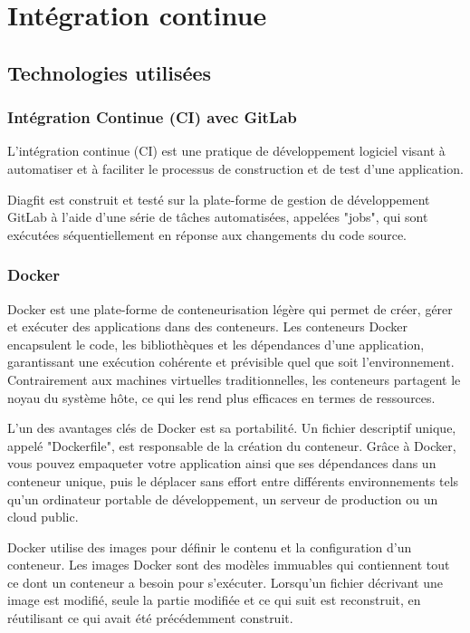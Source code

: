 \section{Intégration continue}
\subsection{Technologies utilisées}
\subsubsection{Intégration Continue (CI) avec GitLab}
L'intégration continue (CI) est une pratique de développement logiciel visant à automatiser et à faciliter le processus de construction et de test d'une application.

Diagfit est construit et testé sur la plate-forme de gestion de développement GitLab à l'aide d'une série de tâches automatisées, appelées "jobs", qui sont exécutées séquentiellement en réponse aux changements du code source.

\subsubsection{Docker}
Docker est une plate-forme de conteneurisation légère qui permet de créer, gérer et exécuter des applications dans des conteneurs.
Les conteneurs Docker encapsulent le code, les bibliothèques et les dépendances d'une application, garantissant une exécution cohérente et prévisible quel que soit l'environnement.
Contrairement aux machines virtuelles traditionnelles, les conteneurs partagent le noyau du système hôte, ce qui les rend plus efficaces en termes de ressources.

L'un des avantages clés de Docker est sa portabilité.
Un fichier descriptif unique, appelé "Dockerfile", est responsable de la création du conteneur.
Grâce à Docker, vous pouvez empaqueter votre application ainsi que ses dépendances dans un conteneur unique, puis le déplacer sans effort entre différents environnements tels qu'un ordinateur portable de développement, un serveur de production ou un cloud public.

Docker utilise des images pour définir le contenu et la configuration d'un conteneur.
Les images Docker sont des modèles immuables qui contiennent tout ce dont un conteneur a besoin pour s'exécuter.
Lorsqu'un fichier décrivant une image est modifié, seule la partie modifiée et ce qui suit est reconstruit, en réutilisant ce qui avait été précédemment construit.


